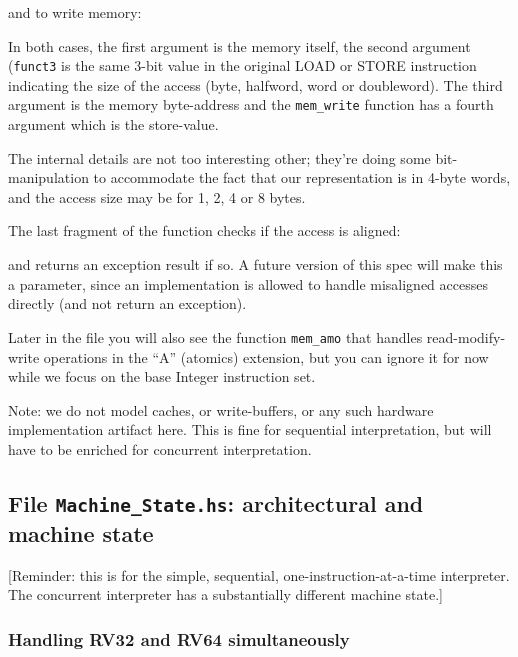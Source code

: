 \documentclass[11pt]{article}
\begin{document}
and to write memory:



In both cases, the first argument is the memory itself, the second
argument (\verb|funct3| is the same 3-bit value in the original LOAD
or STORE instruction indicating the size of the access (byte,
halfword, word or doubleword).  The third argument is the memory
byte-address and the \verb|mem_write| function has a fourth argument
which is the store-value.

The internal details are not too interesting other; they're doing some
bit-manipulation to accommodate the fact that our representation is in
4-byte words, and the access size may be for 1, 2, 4 or 8 bytes.

The last fragment of the function checks if the access is aligned:



and returns an exception result if so.  A future version of this spec
will make this a parameter, since an implementation is allowed to
handle misaligned accesses directly (and not return an exception).

Later in the file you will also see the function \verb|mem_amo| that
handles read-modify-write operations in the ``A'' (atomics) extension,
but you can ignore it for now while we focus on the base Integer
instruction set.

Note: we do not model caches, or write-buffers, or any such hardware
implementation artifact here.  This is fine for sequential
interpretation, but will have to be enriched for concurrent
interpretation.


\subsection{File {\tt Machine\_State.hs}: architectural and machine state}

\label{sec_machine_state}

[Reminder: this is for the simple, sequential,
one-instruction-at-a-time interpreter.  The concurrent interpreter has
a substantially different machine state.]


\subsubsection{Handling RV32 and RV64 simultaneously}
\end{document}
